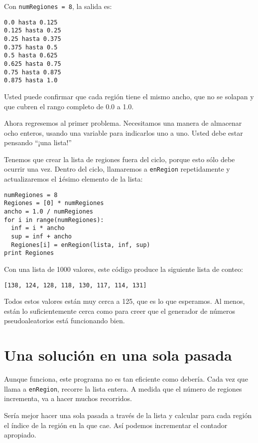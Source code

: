 Con \texttt{numRegiones = 8}, la salida es:

\beforeverb
\begin{verbatim}
0.0 hasta 0.125
0.125 hasta 0.25
0.25 hasta 0.375
0.375 hasta 0.5
0.5 hasta 0.625
0.625 hasta 0.75
0.75 hasta 0.875
0.875 hasta 1.0
\end{verbatim}
\afterverb
%
Usted puede confirmar que cada región tiene el mismo ancho,
que no se solapan y que cubren el rango completo de  0.0 a 1.0.

Ahora regresemos al primer problema. Necesitamos una manera
de almacenar ocho enteros, usando una variable para indicarlos
uno a uno.  Usted debe estar pensando ``¡una lista!''

Tenemos que crear la lista de regiones fuera del ciclo, porque 
esto sólo debe ocurrir una vez. Dentro del ciclo, llamaremos
a \texttt{enRegion} repetidamente y actualizaremos el  \texttt{i}ésimo 
elemento de la lista:

\beforeverb
\begin{verbatim}
numRegiones = 8
Regiones = [0] * numRegiones
ancho = 1.0 / numRegiones
for i in range(numRegiones):
  inf = i * ancho
  sup = inf + ancho
  Regiones[i] = enRegion(lista, inf, sup)
print Regiones
\end{verbatim}
\afterverb
%
Con una lista de 1000 valores, este código produce la siguiente lista
de conteo:

\beforeverb
\begin{verbatim}
[138, 124, 128, 118, 130, 117, 114, 131]
\end{verbatim}
\afterverb
%
Todos estos valores están muy cerca a 125, que es lo que esperamos.
Al menos, están lo suficientemente cerca como para creer que el
generador de números pseudoaleatorios está funcionando bien.




\section{Una solución en una sola pasada}
\label{histograma}

Aunque funciona, este programa no es tan eficiente como debería.
Cada vez que llama a \texttt{enRegion}, recorre la lista entera.  A medida
que el número de regiones incrementa, va a hacer muchos
recorridos.

Sería mejor hacer una sola pasada a través de la lista y calcular
para cada región el índice de la región en la que cae. Así podemos
incrementar el contador apropiado.

